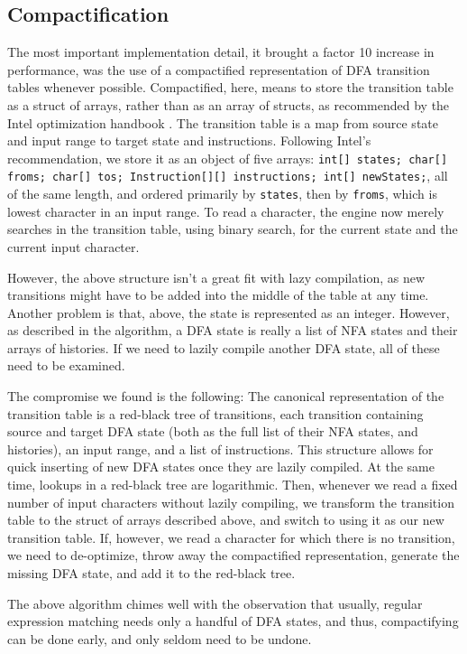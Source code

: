\documentclass[english]{sigplanconf}
\theoremstyle{definition}
\begin{document}
\subsection{Compactification}
The most important implementation detail, it brought a factor 10
increase in performance, was the use of a compactified representation
of DFA transition tables whenever possible.  Compactified, here,
means to store the transition table as a struct of arrays, rather
than as an array of structs, as recommended by the Intel optimization
handbook \cite[section 6.5.1]{Inte13a}.  The transition table is a
map from source state and input range to target state and instructions.
Following Intel's recommendation, we store it as an object of five
arrays: \texttt{int[] states; char[] froms;  char[] tos; Instruction[][]
instructions; int[] newStates;}, all of the same length, and ordered
primarily by \texttt{states}, then by \texttt{froms}, which is
lowest character in an input range.  To read a character, the engine
now merely searches in the transition table, using binary search,
for the current state and the current input character.

However, the above structure isn't a great fit with lazy compilation, 
as new transitions might have to be added into the middle of the table
at any time. 
Another problem is that, above, the state is represented as an integer.
However, as described in the algorithm, a DFA state is really a list of NFA states and their 
arrays of histories. If we need to lazily compile another DFA state, all of these need to be examined.

The compromise we found is the following: The canonical representation
of the transition table is a red-black tree of transitions, each
transition containing source and target DFA state (both as the full
list of their NFA states, and histories), an input range, and a
list of instructions. This structure allows for quick inserting of
new DFA states once they are lazily compiled.  At the same time,
lookups in a red-black tree are logarithmic.  Then, whenever we
read a fixed number of input characters without lazily compiling,
we transform the transition table to the struct of arrays described
above, and switch to using it as our new transition table.
If, however, we read a character for which there is no transition, we need to
de-optimize, throw away the compactified representation, 
generate the missing DFA state, and add it to the red-black tree.

The above algorithm chimes well with the observation that usually,
regular expression matching needs only a handful of DFA states, and thus,
compactifying can be done early, and only seldom need to be undone.
\end{document}
